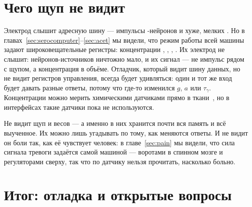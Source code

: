 \section{Чего щуп не видит}

Электрод слышит адресную шину --- импульсы -нейронов и хуже, мелких . Но в главах~\ref{sec:serocomputer}--\ref{sec:acet} мы видели, что режим работы всей машины задают широковещательные регистры: концентрации , , , . Их электрод не слышит: нейронов-источников ничтожно мало, и их сигнал --- не импульс рядом с щупом, а концентрация в объёме. Отладчик, который видит шину данных, но не видит регистров управления, всегда будет удивляться: один и тот же вход будет давать разные ответы, потому что где-то изменился $g$, $a$ или $\tau_\gamma$. Концентрации можно мерить химическими датчиками прямо в ткани~\cite{Bunin1998}, но в интерфейсах такие датчики пока не используются.

Не видит щуп и весов --- а именно в них хранится почти вся память и всё выученное. Их можно лишь угадывать по тому, как меняются ответы. И не видит он боли так, как её чувствует человек: в главе~\ref{sec:pain} мы видели, что сила сигнала тревоги задаётся самой машиной --- воротами в спинном мозге и регуляторами сверху, так что по датчику нельзя прочитать, насколько больно.

\section{Итог: отладка и открытые вопросы}

